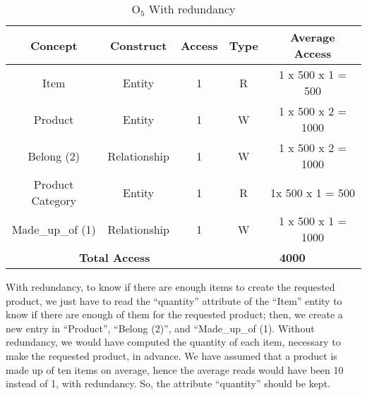 \begin{table}[!h]\caption{	$ \textrm{O}_\textrm{5} $ With redundancy }
	\begin{center}
		\begin{tabular}{| c | c | c | c | c |}
			\hline
			\textbf{Concept} & \textbf{Construct} & \textbf{Access} & \textbf{Type} & \textbf{Average Access} \\ \hline
			Item & Entity & 1 & R & 1 x 500 x 1 = 500 \\ \hline
			Product & Entity & 1 & W & 1 x 500 x 2 = 1000 \\ \hline
			Belong (2) & Relationship & 1 & W & 1 x 500 x 2 = 1000 \\ \hline
			Product Category & Entity & 1 & R & 1x 500 x 1 = 500 \\ \hline
			Made\_up\_of (1) & Relationship & 1 & W & 1 x 500 x 1 = 1000 \\ \hline
			\multicolumn{3}{|c|}{\textbf{Total Access}} & \multicolumn{2}{|c|}{\textbf{4000}} \\ \hline
		\end{tabular}
	\end{center}
\end{table}
\newpage
With redundancy, to know if there are enough items to create the requested product, we just have to read the ``quantity'' attribute of the ``Item'' entity to know if there are enough of them for the requested product; then, we create a new entry in ``Product'', ``Belong (2)'', and ``Made\_up\_of (1). Without redundancy, we would have computed the quantity of each item, necessary to make the requested product, in advance. We have assumed that a product is made up of ten items on average, hence the average reads would have been 10 instead of 1, with redundancy. So, the attribute ``quantity'' should be kept.